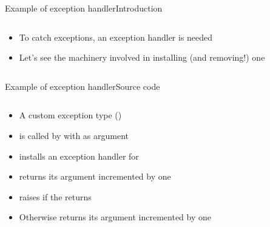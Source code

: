 \begin{frame}{Example of exception handler}{Introduction}
\begin{columns}[c]
\begin{column}{0.6\textwidth}
\begin{itemize}
\item To catch exceptions, an exception handler is needed
\item Let's see the machinery involved in installing (and removing!) one
\end{itemize}
\end{column}
\begin{column}{0.4\textwidth}
\end{column}
\end{columns}
\end{frame}

\begin{frame}{Example of exception handler}{Source code}
\begin{columns}[c]
\begin{column}{0.6\textwidth}
\begin{itemize}
\item A custom exception type ()
\item {} is called by  with  as argument
\item {} installs an exception handler for 
\item {} returns its argument incremented by one
\item {} raises  if the  returns 
\item Otherwise  returns its argument incremented by one
\end{itemize}
\end{column}
\begin{column}{0.4\textwidth}
\end{column}
\end{columns}
\end{frame}

